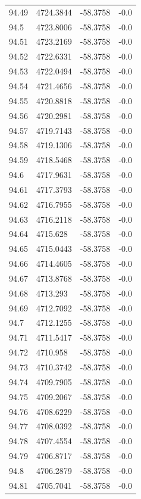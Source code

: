 \begin{table}[H]
\begin{tabular}{llll}
94.49 & 4724.3844 & -58.3758 & -0.0 \\
94.5 & 4723.8006 & -58.3758 & -0.0 \\
94.51 & 4723.2169 & -58.3758 & -0.0 \\
94.52 & 4722.6331 & -58.3758 & -0.0 \\
94.53 & 4722.0494 & -58.3758 & -0.0 \\
94.54 & 4721.4656 & -58.3758 & -0.0 \\
94.55 & 4720.8818 & -58.3758 & -0.0 \\
94.56 & 4720.2981 & -58.3758 & -0.0 \\
94.57 & 4719.7143 & -58.3758 & -0.0 \\
94.58 & 4719.1306 & -58.3758 & -0.0 \\
94.59 & 4718.5468 & -58.3758 & -0.0 \\
94.6 & 4717.9631 & -58.3758 & -0.0 \\
94.61 & 4717.3793 & -58.3758 & -0.0 \\
94.62 & 4716.7955 & -58.3758 & -0.0 \\
94.63 & 4716.2118 & -58.3758 & -0.0 \\
94.64 & 4715.628 & -58.3758 & -0.0 \\
94.65 & 4715.0443 & -58.3758 & -0.0 \\
94.66 & 4714.4605 & -58.3758 & -0.0 \\
94.67 & 4713.8768 & -58.3758 & -0.0 \\
94.68 & 4713.293 & -58.3758 & -0.0 \\
94.69 & 4712.7092 & -58.3758 & -0.0 \\
94.7 & 4712.1255 & -58.3758 & -0.0 \\
94.71 & 4711.5417 & -58.3758 & -0.0 \\
94.72 & 4710.958 & -58.3758 & -0.0 \\
94.73 & 4710.3742 & -58.3758 & -0.0 \\
94.74 & 4709.7905 & -58.3758 & -0.0 \\
94.75 & 4709.2067 & -58.3758 & -0.0 \\
94.76 & 4708.6229 & -58.3758 & -0.0 \\
94.77 & 4708.0392 & -58.3758 & -0.0 \\
94.78 & 4707.4554 & -58.3758 & -0.0 \\
94.79 & 4706.8717 & -58.3758 & -0.0 \\
94.8 & 4706.2879 & -58.3758 & -0.0 \\
94.81 & 4705.7041 & -58.3758 & -0.0 \\

\end{tabular}
\end{table}
